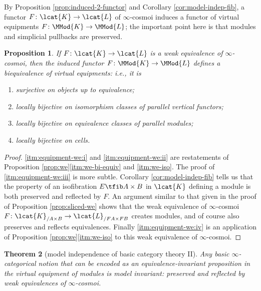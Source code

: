 \documentclass[12pt,reqno]{amsart}
\theoremstyle{plain}
\newtheorem{thm}{Theorem}[subsection]
\newtheorem{prop}[thm]{Proposition}
\theoremstyle{definition}
\theoremstyle{remark}
\numberwithin{equation}{subsection}
\begin{document}
By Proposition \ref{prop:induced-2-functor} and Corollary \ref{cor:model-indep-fib}, a functor $F \colon \lcat{K} \to \lcat{L}$ of $\infty$-cosmoi induces a functor of virtual equipments $F\colon \MMod{K} \to \MMod{L}$; the important point here is that modules and simplicial pullbacks are preserved.

\begin{prop}\label{prop:equipment-we} If $F \colon \lcat{K} \to \lcat{L}$ is a weak equivalence of $\infty$-cosmoi, then the induced functor $F \colon \MMod{K} \to \MMod{L}$ defines a biequivalence of virtual equipments: i.e., it is
\begin{enumerate}[label=(\roman*)]
\item\label{itm:equipment-we:i} surjective on objects up to equivalence;
\item\label{itm:equipment-we:ii} locally bijective on isomorphism classes of parallel vertical functors;
\item\label{itm:equipment-we:iii} locally bijective on equivalence classes of parallel modules;
\item\label{itm:equipment-we:iv} locally bijective on cells.
\end{enumerate}
\end{prop}
\begin{proof}
\ref{itm:equipment-we:i} and \ref{itm:equipment-we:ii} are restatements of Proposition \ref{prop:we}\ref{itm:we-bi-equiv} and \ref{itm:we-iso}. The proof of \ref{itm:equipment-we:iii} is more subtle. Corollary \ref{cor:model-indep-fib} tells us that the property of an isofibration $E \tfib A \times B$ in $\lcat{K}$ defining a module is both preserved and reflected by $F$. An argument similar to that given in the proof of Proposition \ref{prop:sliced-we} shows that the weak equivalence of $\infty$-cosmoi $F \colon \lcat{K}_{/A\times B} \to \lcat{L}_{/FA \times FB}$ creates modules, and of course also preserves and reflects equivalences. Finally \ref{itm:equipment-we:iv} is an application of Proposition \ref{prop:we}\ref{itm:we-iso} to this weak equivalence of $\infty$-cosmoi.
\end{proof}


\begin{thm}[model independence of basic category theory II] Any basic $\infty$-categorical notion that can be encoded as an equivalence-invariant proposition in the virtual equipment of modules is model invariant: preserved and reflected by weak equivalences of $\infty$-cosmoi.
\end{thm}
\end{document}
